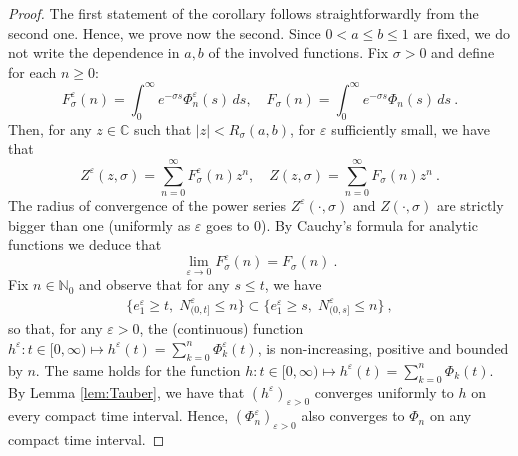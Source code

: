 \documentclass[reqno, 12pt, a4paper]{amsart}
\theoremstyle{plain}
\theoremstyle{definition}
\begin{document}
\begin{proof}
The first statement of the corollary follows straightforwardly from the second one. Hence, we prove now the second. Since $0 < a \le b\le1$ are fixed, we do not write the dependence in $a,b$ of the involved functions.  Fix $\sigma > 0$ and define for each $n \ge 0$:
\[
F^\varepsilon_\sigma(n) = \int_0^\infty e^{-\sigma s} \Phi_n^\varepsilon(s) \, ds, \quad
F_\sigma(n) = \int_0^\infty e^{-\sigma s} \Phi_n (s) \, ds \ .
\]
Then, for any $z \in \mathbb C$ such that $|z| < R_\sigma (a,b)$, for $\varepsilon$ sufficiently small, we have that
\[
Z^\varepsilon(z,\sigma) = \sum_{n=0}^\infty F^\varepsilon_\sigma(n) z^n, \quad
Z(z,\sigma) = \sum_{n=0}^\infty F_\sigma(n) z^n \ .
\]
The radius of  convergence of the power series $Z^\varepsilon (\cdot, \sigma)$ and $Z(\cdot,\sigma)$ are strictly bigger than one (uniformly as $\varepsilon$ goes to $0$). By Cauchy's formula for analytic functions we deduce that
\[
\lim_{\varepsilon \to 0} F^\varepsilon_\sigma(n) = F_\sigma(n) \ .
\]
Fix $n \in \mathbb N_0$ and observe that for any $s\le t$, we have 
\begin{equation}
\begin{split}
\{ e_1^\varepsilon \ge t, \; N_{(0,t]}^\varepsilon \le n \} \subset \{ e_1^\varepsilon \ge s, \; N_{(0,s]}^\varepsilon \le n \} \ ,
\end{split}
\end{equation}
so that, for any $\varepsilon>0$, the (continuous)  function $h^{\varepsilon}: t \in [0, \infty) \mapsto h^\varepsilon (t) = \sum_{k=0}^n \Phi^\varepsilon_k (t)$, is  non-increasing, positive and bounded by $n$. The same holds for the function $h: t \in [0, \infty) \mapsto h^\varepsilon (t) = \sum_{k=0}^n \Phi_k (t)$. By Lemma \ref{lem:Tauber}, we have that $(h^\varepsilon)_{\varepsilon>0}$ converges uniformly to $h$ on every compact time interval. Hence, $(\Phi_n^\varepsilon)_{\varepsilon>0}$ also converges to $\Phi_n$ on any compact time interval.


\end{proof}
\end{document}
